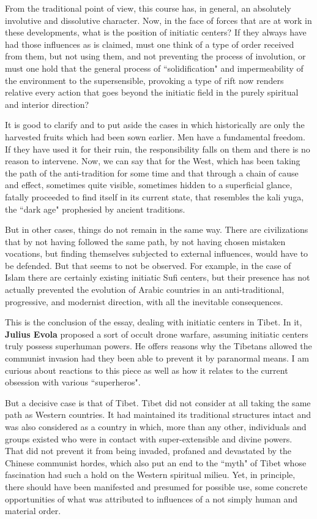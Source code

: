 From the traditional point of view, this course has, in general, an absolutely involutive and dissolutive character. Now, in the face of forces that are at work in these developments, what is the position of initiatic centers? If they always have had those influences as is claimed, must one think of a type of order received from them, but not using them, and not preventing the process of involution, or must one hold that the general process of ``solidification" and impermeability of the environment to the supersensible, provoking a type of rift now renders relative every action that goes beyond the initiatic field in the purely spiritual and interior direction?

It is good to clarify and to put aside the cases in which historically are only the harvested fruits which had been sown earlier. Men have a fundamental freedom. If they have used it for their ruin, the responsibility falls on them and there is no reason to intervene. Now, we can say that for the West, which has been taking the path of the anti-tradition for some time and that through a chain of cause and effect, sometimes quite visible, sometimes hidden to a superficial glance, fatally proceeded to find itself in its current state, that resembles the kali yuga, the ``dark age" prophesied by ancient traditions.

But in other cases, things do not remain in the same way. There are civilizations that by not having followed the same path, by not having chosen mistaken vocations, but finding themselves subjected to external influences, would have to be defended. But that seems to not be observed. For example, in the case of Islam there are certainly existing initiatic Sufi centers, but their presence has not actually prevented the evolution of Arabic countries in an anti-traditional, progressive, and modernist direction, with all the inevitable consequences.

\begin{quotex}
This is the conclusion of the essay, dealing with initiatic centers in Tibet. In it, \textbf{Julius Evola} proposed a sort of occult drone warfare, assuming initiatic centers truly possess superhuman powers. He offers reasons why the Tibetans allowed the communist invasion had they been able to prevent it by paranormal means. I am curious about reactions to this piece as well as how it relates to the current obsession with various ``superheros". 

\end{quotex}
But a decisive case is that of Tibet. Tibet did not consider at all taking the same path as Western countries. It had maintained its traditional structures intact and was also considered as a country in which, more than any other, individuals and groups existed who were in contact with super-extensible and divine powers. That did not prevent it from being invaded, profaned and devastated by the Chinese communist hordes, which also put an end to the ``myth" of Tibet whose fascination had such a hold on the Western spiritual milieu. Yet, in principle, there should have been manifested and presumed for possible use, some concrete opportunities of what was attributed to influences of a not simply human and material order.

